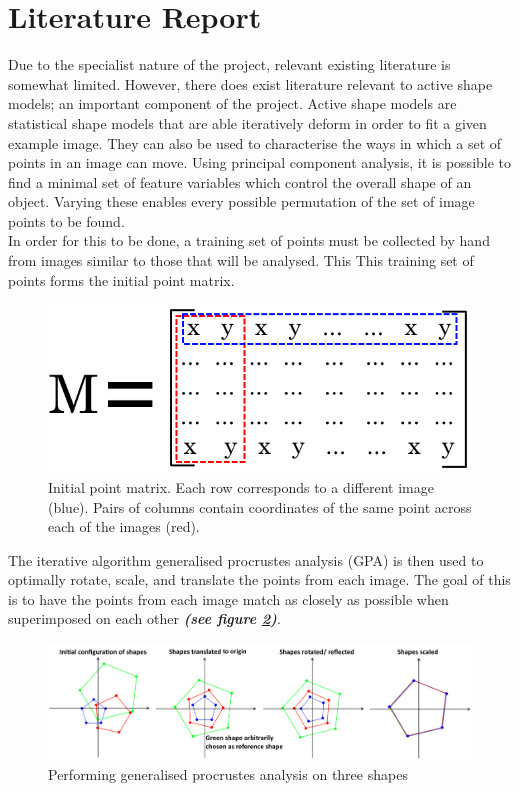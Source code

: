 \documentclass[a4paper, 12pt]{article}
\begin{document}
\section{Literature Report}
%
Due to the specialist nature of the project, relevant existing literature is somewhat limited.
However, there does exist literature relevant to active shape models\cite{cootes}; an important component of the project.
Active shape models are statistical shape models that are able iteratively deform in order to fit a given example image. They can also be used to characterise the ways in which a set of points in an image can move. Using principal component analysis\cite{icl_pca}, it is possible to find a minimal set of feature variables which control the overall shape of an object. Varying these enables every possible permutation of the set of image points to be found.\\
In order for this to be done, a training set of points must be collected by hand from images similar to those that will be analysed. This This training set of points forms the initial point matrix.
%
\begin{figure}[H]
	\centering
	\includegraphics[width=.5\linewidth]{shape_matrix.png}
	\caption{Initial point matrix. Each row corresponds to a different image (blue). Pairs of columns contain coordinates of the same point across each of the images (red).}
	\label{fig:shape_matrix}
\end{figure}
%
\noindent The iterative algorithm generalised procrustes analysis (GPA) is then used to optimally rotate, scale, and translate the points from each image. The goal of this is to have the points from each image match as closely as possible when superimposed on each other \textbf{\emph{(see figure \ref{fig:procrastes})}}.
%
\begin{figure}[H]
	\centering
	\includegraphics[width=\linewidth]{generalised_procrastes_ananlysis.png}
	\caption{Performing generalised procrustes analysis on three shapes}
	\label{fig:procrastes}
\end{figure}
\end{document}
